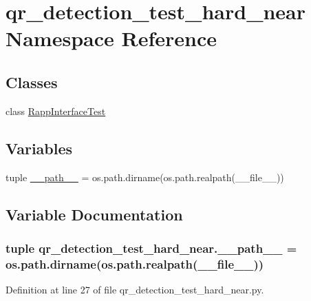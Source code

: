 \hypertarget{namespaceqr__detection__test__hard__near}{\section{qr\-\_\-detection\-\_\-test\-\_\-hard\-\_\-near Namespace Reference}
\label{namespaceqr__detection__test__hard__near}
}
\subsection*{Classes}
\begin{DoxyCompactItemize}
\item 
class \hyperlink{classqr__detection__test__hard__near_1_1RappInterfaceTest}{Rapp\-Interface\-Test}
\end{DoxyCompactItemize}
\subsection*{Variables}
\begin{DoxyCompactItemize}
\item 
tuple \hyperlink{namespaceqr__detection__test__hard__near_af22273cab60857b14ff923e1fbe3e9ff}{\-\_\-\-\_\-path\-\_\-\-\_\-} = os.\-path.\-dirname(os.\-path.\-realpath(\-\_\-\-\_\-file\-\_\-\-\_\-))
\end{DoxyCompactItemize}


\subsection{Variable Documentation}
\hypertarget{namespaceqr__detection__test__hard__near_af22273cab60857b14ff923e1fbe3e9ff}{
\subsubsection[{\-\_\-\-\_\-path\-\_\-\-\_\-}]{\setlength{\rightskip}{0pt plus 5cm}tuple qr\-\_\-detection\-\_\-test\-\_\-hard\-\_\-near.\-\_\-\-\_\-path\-\_\-\-\_\- = os.\-path.\-dirname(os.\-path.\-realpath(\-\_\-\-\_\-file\-\_\-\-\_\-))}}\label{namespaceqr__detection__test__hard__near_af22273cab60857b14ff923e1fbe3e9ff}


Definition at line 27 of file qr\-\_\-detection\-\_\-test\-\_\-hard\-\_\-near.\-py.

